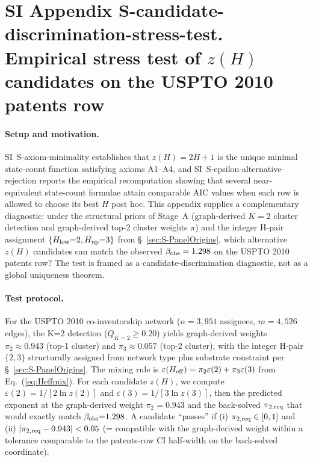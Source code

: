 \section*{SI Appendix S-candidate-discrimination-stress-test. Empirical stress test of \(z(H)\) candidates on the USPTO 2010 patents row}
\sloppy
\label{sec:S-candidate-discrimination-stress-test}

\paragraph{Setup and motivation.}
SI~\textsf{S-axiom-minimality} establishes that \(z(H)=2H+1\) is the unique minimal state-count function satisfying axioms A1--A4, and SI~\textsf{S-epsilon-alternative-rejection} reports the empirical recomputation showing that several near-equivalent state-count formulae attain comparable AIC values when each row is allowed to choose its best \(H\) post hoc. This appendix supplies a complementary diagnostic: under the structural priors of Stage~A (graph-derived \(K{=}2\) cluster detection and graph-derived top-2 cluster weights \(\pi\)) and the integer H-pair assignment \(\{H_{\rm low}{=}2,H_{\rm up}{=}3\}\) from \S~\ref{sec:S-PanelOrigins}, which alternative \(z(H)\) candidates can match the observed \(\beta_{\rm obs}=1.298\) on the USPTO 2010 patents row? The test is framed as a candidate-discrimination diagnostic, not as a global uniqueness theorem.

\paragraph{Test protocol.}
For the USPTO 2010 co-inventorship network (\(n{=}3{,}951\) assignees, \(m{=}4{,}526\) edges), the K=2 detection (\(Q_{K=2}\geq 0.20\)) yields graph-derived weights \(\pi_2\approx 0.943\) (top-1 cluster) and \(\pi_3\approx 0.057\) (top-2 cluster), with the integer H-pair \(\{2,3\}\) structurally assigned from network type plus substrate constraint per \S~\ref{sec:S-PanelOrigins}. The mixing rule is \(\varepsilon(H_{\rm eff})=\pi_2\varepsilon(2)+\pi_3\varepsilon(3)\) from Eq.~(\ref{eq:Heffmix}). For each candidate \(z(H)\), we compute \(\varepsilon(2)=1/[2\ln z(2)]\) and \(\varepsilon(3)=1/[3\ln z(3)]\), then the predicted exponent at the graph-derived weight \(\pi_2{=}0.943\) and the back-solved \(\pi_{2,\rm req}\) that would exactly match \(\beta_{\rm obs}{=}1.298\). A candidate ``passes'' if (i) \(\pi_{2,\rm req}\in[0,1]\) and (ii) \(|\pi_{2,\rm req}-0.943|<0.05\) (= compatible with the graph-derived weight within a tolerance comparable to the patents-row CI half-width on the back-solved coordinate).

